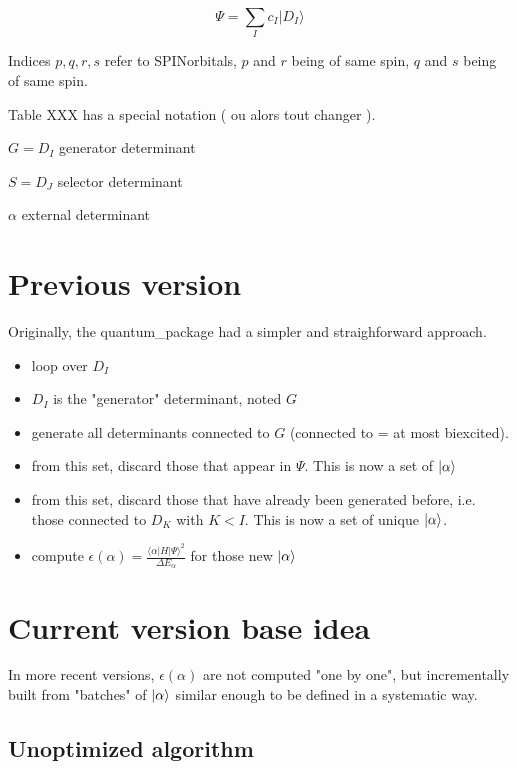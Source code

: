 \documentclass[./thesis.tex]{subfiles}
\begin{document}
\begin{equation}
\Psi = \sum_I {c_I | D_I \rangle}
\end{equation}


Indices $p,q,r,s$ refer to SPINorbitals, $p$ and $r$ being of same spin, $q$ and $s$ being of same spin. 

Table XXX has a special notation ( ou alors tout changer ).

$G = D_I$ generator determinant

$S = D_J$ selector determinant

$\alpha$ external determinant

\section{Previous version}

Originally, the quantum\_package had a simpler and straighforward approach. 

\begin{itemize}
\item
loop over $D_I$
\item
$D_I$ is the "generator" determinant, noted $G$
\item
generate all determinants connected to $G$ (connected to = at most biexcited).
\item
from this set, discard those that appear in $\Psi$. This is now a set of $\ket \alpha$
\item
from this set, discard those that have already been generated before, i.e. those connected to $D_K$ with $K<I$. This is now a set of unique $\ket \alpha$.
\item
compute $\epsilon(\alpha) = \frac{\langle \alpha|H|\Psi\rangle^2}{\Delta E_\alpha}$ for those new $\ket \alpha$
\end{itemize}

\section{Current version base idea}



In more recent versions, $\epsilon(\alpha)$ are not computed "one by one", but incrementally built from "batches" of $\ket \alpha$ similar enough to be defined in a systematic way.

\subsection{Unoptimized algorithm}
\end{document}

